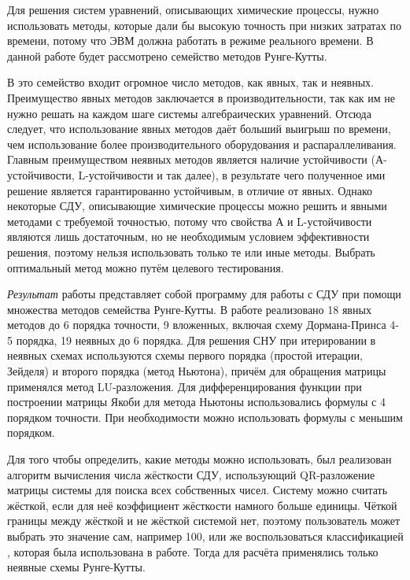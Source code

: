 \introduction %

Для решения систем уравнений, описывающих химические процессы, нужно использовать методы, которые дали бы высокую точность при низких
затратах по времени, потому что ЭВМ должна работать в режиме реального времени. В данной работе будет рассмотрено семейство методов
Рунге-Кутты.

В это семейство входит огромное число методов, как явных, так и неявных. Преимущество явных методов заключается в производительности,
так как им не нужно решать на каждом шаге системы алгебраических уравнений. Отсюда следует, что использование явных методов даёт
больший выигрыш по времени, чем использование более производительного оборудования и распараллеливания. Главным преимуществом неявных
методов является наличие устойчивости (А-устойчивости, L-устойчивости и так далее), в результате чего полученное ими решение является
гарантированно устойчивым, в отличие от явных. Однако некоторые СДУ, описывающие химические процессы можно решить и явными методами с
требуемой точностью, потому что свойства А и L-устойчивости являются лишь достаточным, но не необходимым условием эффективности
решения, поэтому нельзя использовать только те или иные методы. Выбрать оптимальный метод можно путём целевого тестирования.

\textit{Результат} работы представляет собой программу для работы с СДУ при помощи множества методов семейства Рунге-Кутты. В работе
реализовано 18 явных методов до 6 порядка точности, 9 вложенных, включая схему Дормана-Принса 4-5 порядка, 19 неявных до 6 порядка. Для 
решения СНУ при итерировании в неявных схемах используются схемы первого порядка (простой итерации, Зейделя) и второго порядка
(метод Ньютона), причём для обращения матрицы применялся метод LU-разложения. Для дифференцирования функции при построении
матрицы Якоби для метода Ньютоны использовались формулы с 4 порядком точности. При необходимости можно использовать формулы
с меньшим порядком.

Для того чтобы определить, какие методы можно использовать, был реализован алгоритм вычисления числа жёсткости СДУ,
использующий QR-разложение матрицы системы для поиска всех собственных чисел. Систему можно считать жёсткой, если для
неё коэффициент жёсткости намного больше единицы. Чёткой границы между жёсткой и не жёсткой системой нет, поэтому пользователь
может выбрать это значение сам, например 100, или же воспользоваться классификацией \cite{Article3}, которая была использована в работе.
Тогда для расчёта применялись только неявные схемы Рунге-Кутты.

